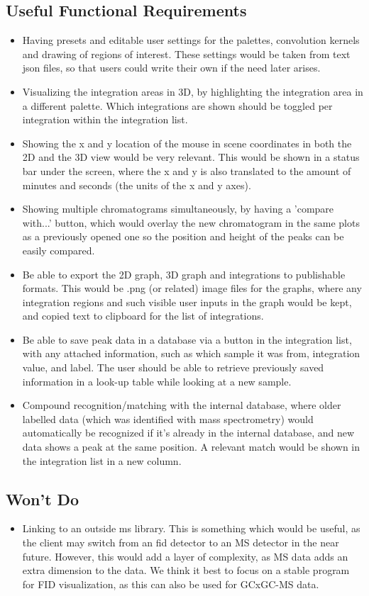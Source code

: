 \documentclass{article}
\begin{document}
\subsection{Useful Functional Requirements}
\begin{itemize}
    \item Having presets and editable user settings for the palettes, convolution kernels and drawing of regions of interest. These settings would be taken from text json files, so that users could write their own if the need later arises.
    \item Visualizing the integration areas in 3D, by highlighting the integration area in a different palette. Which integrations are shown should be toggled per integration within the integration list.
    \item Showing the x and y location of the mouse in scene coordinates in both the 2D and the 3D view would be very relevant. This would be shown in a status bar under the screen, where the x and y is also translated to the amount of minutes and seconds (the units of the x and y axes).
    \item Showing multiple chromatograms simultaneously, by having a 'compare with...' button, which would overlay the new chromatogram in the same plots as a previously opened one so the position and height of the peaks can be easily compared. 
    \item Be able to export the 2D graph, 3D graph and integrations to publishable formats. This would be .png (or related) image files for the graphs, where any integration regions and such visible user inputs in the graph would be kept, and copied text to clipboard for the list of integrations.
    \item Be able to save peak data in a database via a button in the integration list, with any attached information, such as which sample it was from, integration value, and label. The user should be able to retrieve previously saved information in a look-up table while looking at a new sample.
	\item Compound recognition/matching with the internal database, where older labelled data (which was identified with mass spectrometry) would automatically be recognized if it's already in the internal database, and new data shows a peak at the same position. A relevant match would be shown in the integration list in a new column.
\end{itemize}
\subsection{Won't Do}
\begin{itemize}
	\item Linking to an outside \acrlong{ms}  library. This is something which would be useful, as the client may switch from an \acrfull{fid} detector to an MS detector in the near future. However, this would add a layer of complexity, as MS data adds an extra dimension to the data. We think it best to focus on a stable program for FID visualization, as this can also be used for GCxGC-MS data. 
\end{itemize}
\end{document}
